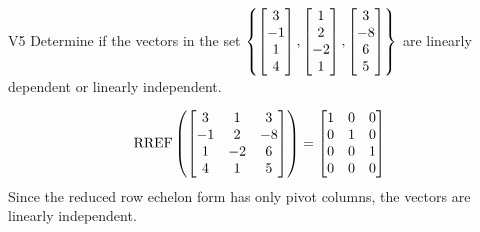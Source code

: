 \begin{problem}{V5}
Determine if the vectors in the set \(\left\{\begin{bmatrix} 3 \\ -1 \\ 1 \\ 4 \end{bmatrix}, \begin{bmatrix} 1  \\ 2 \\ -2 \\ 1 \end{bmatrix}, \begin{bmatrix} 3 \\ -8 \\ 6 \\ 5 \end{bmatrix} \right\}\)  are linearly dependent or linearly independent.
\end{problem}
\begin{solution}
\[\operatorname{RREF}\left(\begin{bmatrix} 3 & 1 & 3 \\ -1 & 2 & -8 \\ 1 & -2 & 6 \\ 4 & 1 & 5 \end{bmatrix} \right) = \begin{bmatrix} 1 & 0 & 0 \\ 0 & 1 & 0 \\ 0 & 0 & 1 \\ 0 & 0 & 0 \end{bmatrix}\]
Since the reduced row echelon form has only pivot columns, the vectors are linearly independent.
\end{solution}

